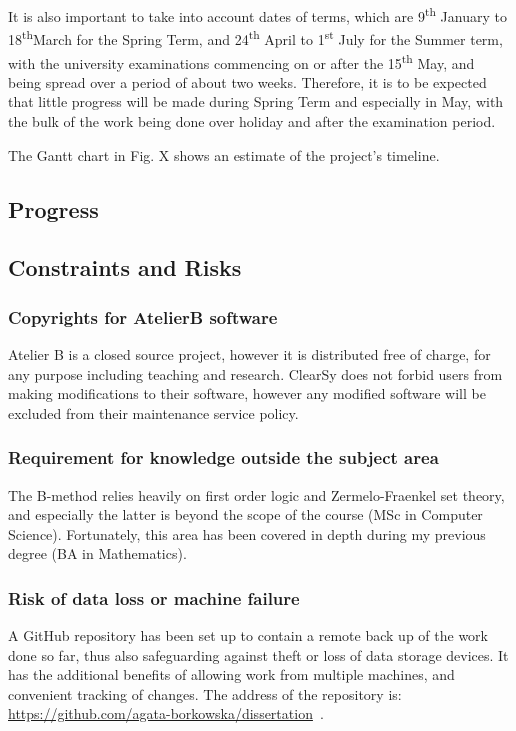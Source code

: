 \documentclass[11pt,journal]{IEEEtran}
\begin{document}
	It is also important to take into account dates of terms, which are 9\textsuperscript{th} January to 18\textsuperscript{th}March for the Spring Term, and 24\textsuperscript{th} April to 1\textsuperscript{st} July for the Summer term, with the university examinations commencing on or after the 15\textsuperscript{th} May, and being spread over a period of about two weeks. Therefore, it is to be expected that little progress will be made during Spring Term and especially in May, with the bulk of the work being done over holiday and after the examination period.
	
	The Gantt chart in Fig. X shows an estimate of the project's timeline. 
		
	\subsection{Progress}
	
	\subsection{Constraints and Risks}
	\subsubsection{Copyrights for AtelierB software}
	Atelier B is a closed source project, however it is distributed free of charge, for any purpose including teaching and research. ClearSy does not forbid users from making modifications to their software, however any modified software will be excluded from their maintenance service policy.
	
	\subsubsection{Requirement for knowledge outside the subject area}
	The B-method relies heavily on first order logic and Zermelo-Fraenkel set theory, and especially the latter is beyond the scope of the course (MSc in Computer Science). Fortunately, this area has been covered in depth during my previous degree (BA in Mathematics).
	
	\subsubsection{Risk of data loss or machine failure}
	A GitHub repository has been set up to contain a remote back up of the work done so far, thus also safeguarding against theft or loss of data storage devices. It has the additional benefits of allowing work from multiple machines, and convenient tracking of changes. The address of the repository is: \url{https://github.com/agata-borkowska/dissertation}~.
	
\end{document}
